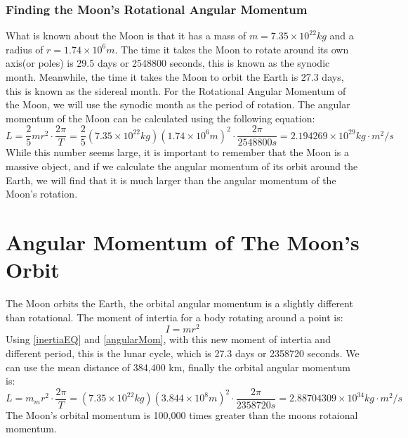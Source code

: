 \documentclass[12pt,oneside,a4paper,english]{article}
\begin{document}
\subsubsection{Finding the Moon's Rotational Angular Momentum}
What is known about the Moon is that it has a mass of \(m = 7.35 \times 10^{22} kg\) and a radius of \(r = 1.74 \times 10^6 m\). The time it takes the Moon to rotate around its own axis(or poles) is 29.5 days or 2548800 seconds, this is known as the synodic month. Meanwhile, the time it takes the Moon to orbit the Earth is 27.3 days, this is known as the sidereal month. For the Rotational Angular Momentum of the Moon, we will use the synodic month as the period of rotation. The angular momentum of the Moon can be calculated using the following equation:
\begin{equation}
    L = \frac{2}{5} m r^2 \cdot \frac{2 \pi}{T} = \frac{2}{5} (7.35 \times 10^{22} kg) (1.74 \times 10^6 m)^2 \cdot \frac{2 \pi}{2548800 s} = 2.194269 \times 10^{29} kg\cdot m^2/s
\end{equation}
While this number seems large, it is important to remember that the Moon is a massive object, and if we calculate the angular momentum of its orbit around the Earth, we will find that it is much larger than the angular momentum of the Moon's rotation. 
\section{Angular Momentum of The Moon's Orbit}
The Moon orbits the Earth, the orbital angular momentum is a slightly different than rotational. The moment of intertia for a body rotating around a point is:
\begin{equation}
    I=mr^2
\end{equation}
Using \ref{inertiaEQ} and \ref{angularMom}, with this new moment of intertia and different period, this is the lunar cycle, which is 27.3 days or 2358720 seconds. We can use the mean distance of 384,400 km, finally the orbital angular momentum is:
\begin{equation}
    L =  m_m r^2 \cdot \frac{2 \pi}{T} = (7.35 \times 10^{22} kg) (3.844 \times 10^8 m)^2 \cdot \frac{2 \pi}{2358720 s} = 2.88704309 \times 10^{34} kg\cdot m^2/s
\end{equation}
The Moon's orbital momentum is 100,000 times greater than the moons rotaional momentum.
\end{document}
